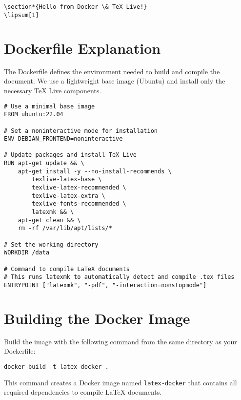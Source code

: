 \begin{verbatim}


\section*{Hello from Docker \& TeX Live!}
\lipsum[1]

\end{verbatim}

\section{Dockerfile Explanation}

The Dockerfile defines the environment needed to build and compile the document. We use a lightweight base image (Ubuntu) and install only the necessary TeX Live components.

\begin{verbatim}
# Use a minimal base image
FROM ubuntu:22.04

# Set a noninteractive mode for installation
ENV DEBIAN_FRONTEND=noninteractive

# Update packages and install TeX Live
RUN apt-get update && \
    apt-get install -y --no-install-recommends \
        texlive-latex-base \
        texlive-latex-recommended \
        texlive-latex-extra \
        texlive-fonts-recommended \
        latexmk && \
    apt-get clean && \
    rm -rf /var/lib/apt/lists/*

# Set the working directory
WORKDIR /data

# Command to compile LaTeX documents
# This runs latexmk to automatically detect and compile .tex files
ENTRYPOINT ["latexmk", "-pdf", "-interaction=nonstopmode"]
\end{verbatim}

\section{Building the Docker Image}

Build the image with the following command from the same directory as your Dockerfile:

\begin{verbatim}
docker build -t latex-docker .
\end{verbatim}

This command creates a Docker image named \texttt{latex-docker} that contains all required dependencies to compile \LaTeX{} documents.

